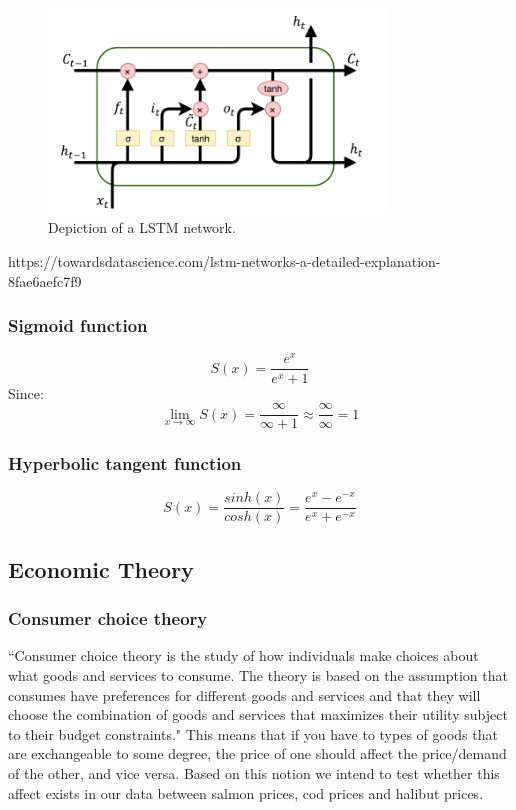 \begin{figure}[H]
    \centering
    \includegraphics[width=0.8\textwidth]{data/Figures/Neural networks/lstm.png}
    \caption[Long Short-Term Memory network]{Depiction of a LSTM network.~\cite{dolphin_2021}}\label{fig:LSTM}
\end{figure}

https://towardsdatascience.com/lstm-networks-a-detailed-explanation-8fae6aefc7f9
\subsubsection{Sigmoid function}
\begin{equation}
    S(x) = \frac{e^x}{e^x+1}
\end{equation}
Since: 
\begin{equation}
    \lim_{x \to \infty}S(x) = \frac{\infty}{\infty+1} \approx \frac{\infty}{\infty} = 1
\end{equation}
\subsubsection{Hyperbolic tangent function}
\begin{equation}
    S(x) = \frac{sinh(x)}{cosh(x)} = \frac{e^x-e^{-x}}{e^x+e^{-x}}
\end{equation}

\subsection{Economic Theory}
\subsubsection{Consumer choice theory}
``Consumer choice theory is the study of how individuals make choices about what goods and services to consume. The theory is based on the assumption that consumes have preferences for different goods and services and that they will choose the combination of goods and services that maximizes their utility subject to their budget constraints." \parencite{Perloff_2017} This means that if you have to types of goods that are exchangeable to some degree, the price of one should affect the price/demand of the other, and vice versa. Based on this notion we intend to test whether this affect exists in our data between salmon prices, cod prices and halibut prices.